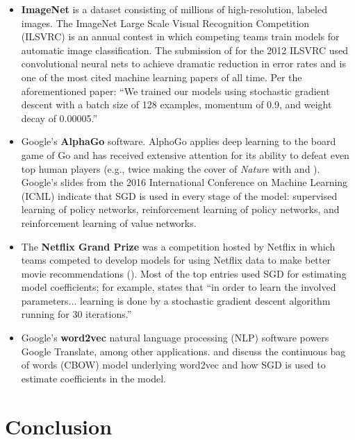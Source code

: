 \documentclass{article}
\begin{document}
\begin{itemize}
	\item \textbf{ImageNet} is a dataset consisting of millions
		of high-resolution, labeled images. The
		ImageNet Large Scale Visual Recognition Competition (ILSVRC) is
		an annual contest in which competing teams train models for
		automatic image classification. The submission of \cite{krizhevsky2012imagenet} 
		for the 2012 ILSVRC used convolutional neural
		nets to achieve dramatic reduction in error rates and is
		one of the most cited machine learning papers of all time. Per the aforementioned paper: ``We
		trained our models using stochastic gradient descent with a
		batch size of 128 examples, momentum of 0.9, and weight decay of
		0.00005.''
	\item Google's \textbf{AlphaGo} software. AlphoGo applies deep learning to the
		board game of Go and has received extensive attention for its
		ability to defeat even top human players (e.g., twice making the
		cover of \textit{Nature} with \cite{silver2016mastering} and
		\cite{silver2017mastering}). Google's slides from the 2016
		International Conference on Machine Learning (ICML) indicate
		that SGD is used in every stage of the
		model: supervised learning of policy networks, reinforcement
		learning of policy networks, and reinforcement learning of value
		networks.
	\item The \textbf{Netflix Grand Prize} was a competition hosted by
		Netflix in which teams competed to develop models for
		using Netflix data to make better movie recommendations
		(\cite{bennett2007netflix}). Most of the top entries used
		SGD for estimating model coefficients; for example,
		\cite{koren2009bellkor} states that ``in order to learn the
		involved parameters$\ldots$ learning is done by a stochastic
		gradient descent algorithm running for 30 iterations.'' 
	\item Google's \textbf{word2vec} natural language processing (NLP)
		software powers Google Translate, among other applications.
		\cite{mikolov2013distributed} and \cite{rong2014word2vec}
		discuss the continuous bag of words (CBOW) model underlying
		word2vec and how SGD is used to estimate coefficients
		in the model.
\end{itemize}

\section{Conclusion}

\printbibliography
\end{document}
